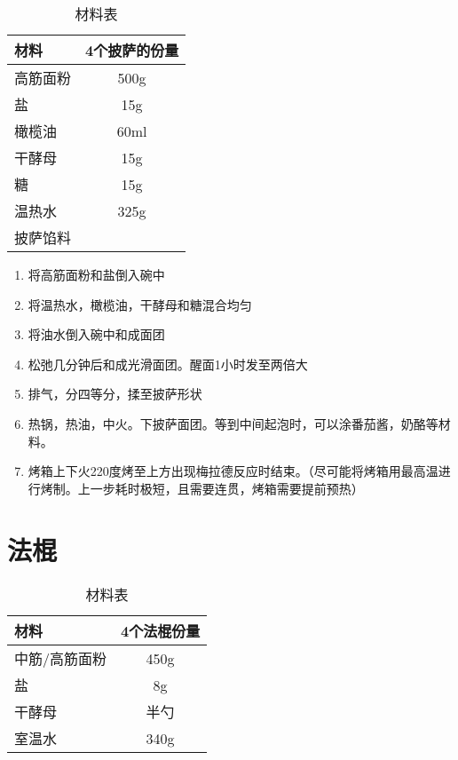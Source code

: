 \begin{table}[H]
    \centering
    \begin{tabular}{|l||c|}\hline
     \textbf{材料}    &  \textbf{4个披萨的份量}\\ \hline\hline
    高筋面粉 & 500g \\ \hline
    盐 & 15g \\ \hline
    橄榄油 & 60ml \\ \hline
    干酵母 & 15g \\ \hline
    糖 & 15g \\ \hline
    温热水 & 325g \\ \hline
    披萨馅料 & \\ \hline
    \end{tabular}
    \caption{材料表}
\end{table}

\begin{enumerate}
    \item 将高筋面粉和盐倒入碗中
    \item 将温热水，橄榄油，干酵母和糖混合均匀
    \item 将油水倒入碗中和成面团
    \item 松弛几分钟后和成光滑面团。醒面1小时发至两倍大
    \item 排气，分四等分，揉至披萨形状
    \item 热锅，热油，中火。下披萨面团。等到中间起泡时，可以涂番茄酱，奶酪等材料。
    \item 烤箱上下火220度烤至上方出现梅拉德反应时结束。（尽可能将烤箱用最高温进行烤制。上一步耗时极短，且需要连贯，烤箱需要提前预热）
\end{enumerate}


\section{法棍}

\begin{table}[H]
    \centering
    \begin{tabular}{|l||c|}\hline
     \textbf{材料}    &  \textbf{4个法棍份量}\\ \hline\hline
    中筋/高筋面粉 & 450g \\ \hline
    盐 & 8g \\ \hline
    干酵母 & 半勺 \\ \hline
    室温水 & 340g \\ \hline
    \end{tabular}
    \caption{材料表}
\end{table}

